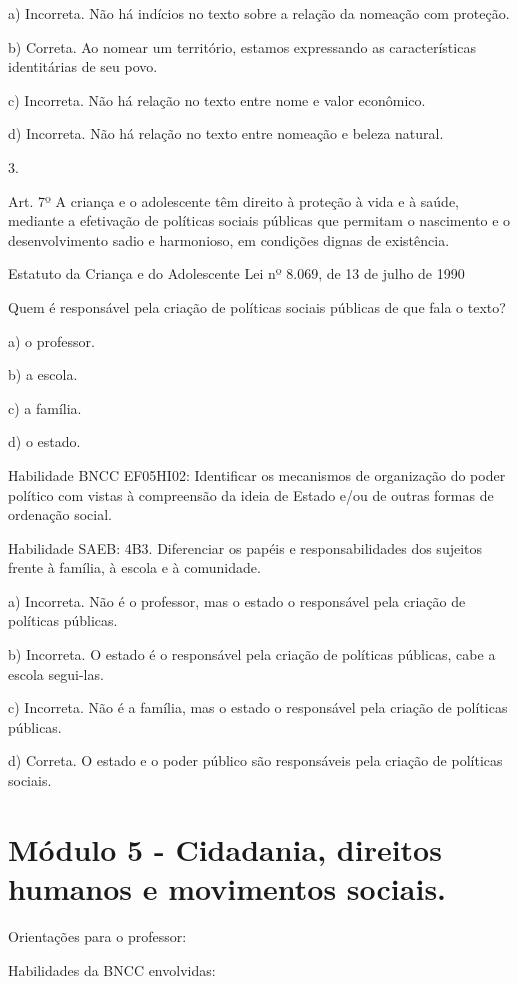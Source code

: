 a) Incorreta. Não há indícios no texto sobre a relação da nomeação com
proteção.

b) Correta. Ao nomear um território, estamos expressando as
características identitárias de seu povo.

c) Incorreta. Não há relação no texto entre nome e valor econômico.

d) Incorreta. Não há relação no texto entre nomeação e beleza natural.

3.

Art. 7º A criança e o adolescente têm direito à proteção à vida e à
saúde, mediante a efetivação de políticas sociais públicas que permitam
o nascimento e o desenvolvimento sadio e harmonioso, em condições dignas
de existência.

Estatuto da Criança e do Adolescente Lei nº 8.069, de 13 de julho de
1990

Quem é responsável pela criação de políticas sociais públicas de que
fala o texto?

a) o professor.

b) a escola.

c) a família.

d) o estado.

Habilidade BNCC EF05HI02: Identificar os mecanismos de organização do
poder político com vistas à compreensão da ideia de Estado e/ou de
outras formas de ordenação social.

Habilidade SAEB: 4B3. Diferenciar os papéis e responsabilidades dos
sujeitos frente à família, à escola e à comunidade.

a) Incorreta. Não é o professor, mas o estado o responsável pela criação
de políticas públicas.

b) Incorreta. O estado é o responsável pela criação de políticas
públicas, cabe a escola segui-las.

c) Incorreta. Não é a família, mas o estado o responsável pela criação
de políticas públicas.

d) Correta. O estado e o poder público são responsáveis pela criação de
políticas sociais.

\section{Módulo 5 - Cidadania, direitos humanos e movimentos
sociais.}\label{muxf3dulo-5---cidadania-direitos-humanos-e-movimentos-sociais.}

Orientações para o professor:

Habilidades da BNCC envolvidas:

